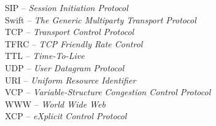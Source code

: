 SIP		-- \textit{Session Initiation Protocol}\\
Swift		-- \textit{The Generic Multiparty Transport Protocol}\\
TCP		-- \textit{Transport Control Protocol}\\
TFRC		-- \textit{TCP Friendly Rate Control}\\
TTL		-- \textit{Time-To-Live}\\
UDP		-- \textit{User Datagram Protocol}\\
URI		-- \textit{Uniform Resource Identifier}\\
VCP		-- \textit{Variable-Structure Congestion Control Protocol}\\
WWW		-- \textit{World Wide Web}\\
XCP		-- \textit{eXplicit Control Protocol}\\